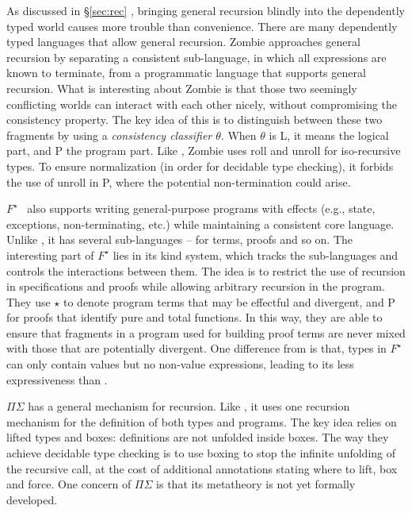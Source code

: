 As discussed in \S\ref{sec:rec}  , bringing general recursion blindly into the dependently typed world causes more trouble than convenience. There are many dependently typed languages that allow general recursion. Zombie approaches general recursion by separating a consistent sub-language, in which all expressions are known to terminate, from a programmatic language that supports general recursion. What is interesting about Zombie is that those two seemingly conflicting worlds can interact with each other nicely, without compromising the consistency property. The key idea of this is to distinguish between these two fragments by using a \emph{consistency classifier $\theta$}. When $\theta$ is \textsf{L}, it means the logical part, and \textsf{P} the program part. Like \name, Zombie uses \textsf{roll} and \textsf{unroll} for iso-recursive types. To ensure normalization (in order for decidable type checking), it forbids the use of \textsf{unroll} in \textsf{P}, where the potential non-termination could arise.

$F^{\star}$~\cite{Swamy2011} also supports writing general-purpose programs with effects (e.g., state, exceptions, non-terminating, etc.) while maintaining a consistent core language. Unlike \name, it has several sub-languages -- for terms, proofs and so on. The interesting part of $F^{\star}$ lies in its kind system, which tracks the sub-languages and controls the interactions between them. The idea is to restrict the use of recursion in specifications and proofs while allowing arbitrary recursion in the program. They use $\star$ to denote program terms that may be effectful and divergent, and \textsf{P} for proofs that identify pure and total functions. In this way, they are able to ensure that fragments in a program used for building proof terms are never mixed with those that are potentially divergent. One difference from \name is that, types in $F^{\star}$ can only contain values but no non-value expressions, leading to its less expressiveness than \name.

$\Pi\Sigma$ has a general mechanism for recursion. Like \name, it uses one recursion mechanism for the definition of both types and programs. The key idea relies on lifted types and boxes: definitions are not unfolded inside boxes. The way they achieve decidable type checking is to use boxing to stop the infinite unfolding of the recursive call, at the cost of additional annotations stating where to lift, box and force. One concern of $\Pi\Sigma$ is that its metatheory is not yet formally developed.

